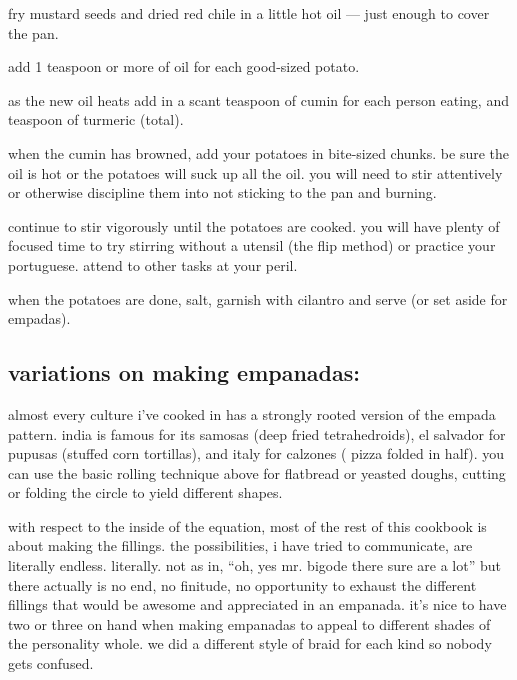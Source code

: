 \begin{algorithm}
  \item fry mustard seeds and dried red chile in a little hot oil ---
  just enough to cover the pan.

  \item add 1 teaspoon or more of oil for each good-sized potato.

  \item as the new oil heats add in a scant teaspoon of cumin for each
  person eating, and \onehalf teaspoon of turmeric (total).

  \item when the cumin has browned, add your potatoes in bite-sized
  chunks. be sure the oil is hot or the potatoes will suck up all the
  oil. you will need to stir attentively or otherwise discipline them
  into not sticking to the pan and burning.

  \item continue to stir vigorously until the potatoes are cooked. you
  will have plenty of focused time to try stirring without a utensil
  (the flip method) or practice your portuguese. attend to other tasks
  at your peril.

  \item when the potatoes are done, salt, garnish with cilantro and
  serve (or set aside for empadas).
\end{algorithm}

\subsection{variations on making empanadas:}

almost every culture i've cooked in has a strongly rooted version of
the empada pattern. india is famous for its samosas (deep fried
tetrahedroids), el salvador for pupusas (stuffed corn tortillas), and
italy for calzones ( pizza folded in half). you can use the basic
rolling technique above for flatbread or yeasted doughs, cutting or
folding the circle to yield different shapes.

with respect to the inside of the equation, most of the rest of this
cookbook is about making the fillings. the possibilities, i have tried
to communicate, are literally endless. literally. not as in, ``oh, yes
mr. bigode there sure are a lot'' but there actually is no end, no
finitude, no opportunity to exhaust the different fillings that would
be awesome and appreciated in an empanada. it's nice to have two or
three on hand when making empanadas to appeal to different shades of
the personality whole. we did a different style of braid for each kind
so nobody gets confused.

